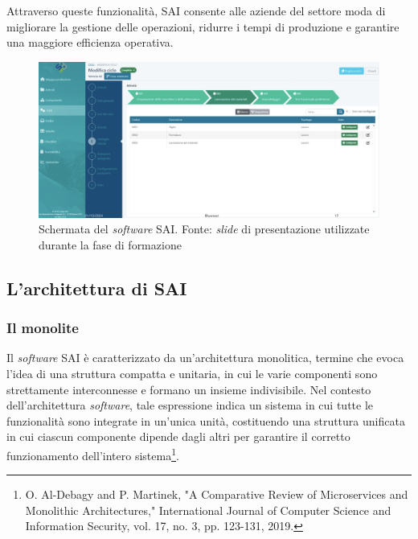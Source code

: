         \vspace{0.2 em}
        \noindent Attraverso queste funzionalità, SAI consente alle aziende del settore moda di migliorare la gestione delle operazioni, ridurre i tempi di produzione e garantire una maggiore efficienza operativa.

        \begin{figure}[H]
            \centering
            \includegraphics[width=1.0\linewidth]{BCS-Tessi//images/schermata_SAI.png}
            \caption[Schermata del \textit{software} SAI di SogeaSoft S.r.l.]{Schermata del \textit{software} SAI. Fonte: \textit{slide} di presentazione utilizzate durante la fase di formazione}
            \label{fig:screenSAI}
        \end{figure}
        
        \subsection{L'architettura di SAI}
        
            \subsubsection{Il monolite}
            
            Il \textit{software} SAI è caratterizzato da un’architettura monolitica, termine che evoca l’idea di una struttura compatta e unitaria, in cui le varie componenti sono strettamente interconnesse e formano un insieme indivisibile. Nel contesto dell'architettura \textit{software}, tale espressione indica un sistema in cui tutte le funzionalità sono integrate in un’unica unità, costituendo una struttura unificata in cui ciascun componente dipende dagli altri per garantire il corretto funzionamento dell’intero sistema\footnote{O. Al-Debagy and P. Martinek, "A Comparative Review of Microservices and Monolithic Architectures," International Journal of Computer Science and Information Security, vol. 17, no. 3, pp. 123-131, 2019.}.  

